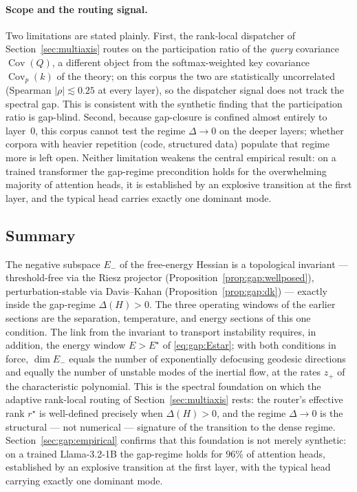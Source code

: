 \paragraph{Scope and the routing signal.}
Two limitations are stated plainly.  First, the rank-local dispatcher of
Section~\ref{sec:multiaxis} routes on the participation ratio of the
\emph{query} covariance $\operatorname{Cov}(Q)$, a different object from the
softmax-weighted key covariance $\operatorname{Cov}_p(k)$ of the theory; on
this corpus the two are statistically uncorrelated (Spearman
$|\rho|\lesssim0.25$ at every layer), so the dispatcher signal does not
track the spectral gap.  This is consistent with the synthetic finding that
the participation ratio is gap-blind.  Second, because gap-closure is
confined almost entirely to layer~$0$, this corpus cannot test the regime
$\Delta\to0$ on the deeper layers; whether corpora with heavier repetition
(code, structured data) populate that regime more is left open.  Neither
limitation weakens the central empirical result: on a trained transformer
the gap-regime precondition holds for the overwhelming majority of attention
heads, it is established by an explosive transition at the first layer, and
the typical head carries exactly one dominant mode.

\subsection{Summary}
\label{sec:gap:summary}

The negative subspace $E_-$ of the free-energy Hessian is a topological
invariant --- threshold-free via the Riesz projector
(Proposition~\ref{prop:gap:wellposed}), perturbation-stable via Davis--Kahan
(Proposition~\ref{prop:gap:dk}) --- exactly inside the gap-regime
$\Delta(H)>0$. The three operating windows of the earlier sections are the
separation, temperature, and energy sections of this one condition. The link
from the invariant to transport instability requires, in addition, the energy
window $E>E^\star$ of \eqref{eq:gap:Estar}; with both conditions in force,
$\dim E_-$ equals the number of exponentially defocusing geodesic directions
and equally the number of unstable modes of the inertial flow, at the rates
$z_+$ of the characteristic polynomial. This is the spectral foundation on
which the adaptive rank-local routing of Section~\ref{sec:multiaxis} rests:
the router's effective rank $r^\star$ is well-defined precisely when
$\Delta(H)>0$, and the regime $\Delta\to0$ is the structural --- not
numerical --- signature of the transition to the dense regime.
Section~\ref{sec:gap:empirical} confirms that this foundation is not merely
synthetic: on a trained Llama-3.2-1B the gap-regime holds for $96\%$ of
attention heads, established by an explosive transition at the first layer,
with the typical head carrying exactly one dominant mode.
